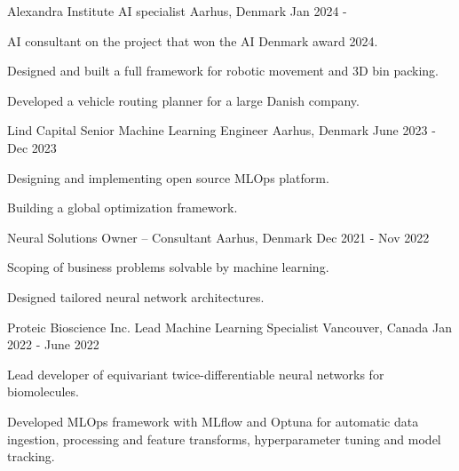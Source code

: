 \begin{cventries}
\vspace{5mm}

  \cventry
  {Alexandra Institute} %
  {AI specialist} %
    {Aarhus, Denmark} %
    {Jan 2024 - } %
    {
      \begin{cvitems} %
        \item {AI consultant on the project that won the AI Denmark award 2024.}
        \item {Designed and built a full framework for robotic movement and 3D bin packing.}
        \item {Developed a vehicle routing planner for a large Danish company.}
      \end{cvitems}
    }


  \cventry
  {Lind Capital} %
  {Senior Machine Learning Engineer} %
    {Aarhus, Denmark} %
    {June 2023 - Dec 2023} %
    {
      \begin{cvitems} %
        \item {Designing and implementing open source MLOps platform.}
        \item {Building a global optimization framework.}
      \end{cvitems}
    }


  \cventry
  {Neural Solutions} %
  {Owner -- Consultant} %
    {Aarhus, Denmark} %
    {Dec 2021 - Nov 2022} %
    {
      \begin{cvitems} %
        \item {Scoping of business problems solvable by machine learning.}
        \item {Designed tailored neural network architectures.}
      \end{cvitems}
    }


  \cventry
  {Proteic Bioscience Inc.} %
  {Lead Machine Learning Specialist} %
    {Vancouver, Canada} %
    {Jan 2022 - June 2022} %
    {
      \begin{cvitems} %
        \item {Lead developer of equivariant twice-differentiable neural networks for biomolecules.}
        \item {Developed MLOps framework with MLflow and Optuna for automatic data ingestion, processing and feature transforms, hyperparameter tuning and model tracking.}
      \end{cvitems}
    }


\end{cventries}
